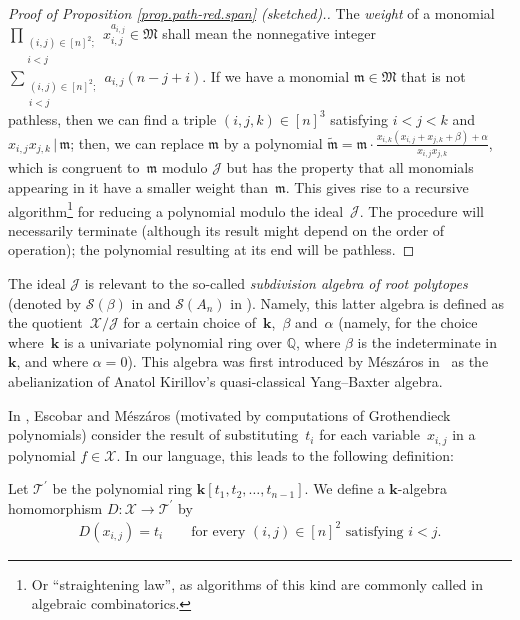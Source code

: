 \documentclass[11pt]{article}
\numberwithin{equation}{section}
\let\sumnonlimits\sum
\let\prodnonlimits\prod
\renewcommand{\sum}{\sumnonlimits\limits}
\renewcommand{\prod}{\prodnonlimits\limits}
\begin{document}
\begin{proof}[Proof of Proposition \ref{prop.path-red.span} (sketched).]The \textit{weight} of a monomial $\prod_{\substack{(i,j) \in[n] ^{2};\\i<j}}x_{i,j}^{a_{i,j}}\in\mathfrak{M}$ shall mean the nonnegative integer $\sum_{\substack{(i,j) \in[n] ^{2};\\i<j}}a_{i,j}(n-j+i) $. If we have a monomial $\mathfrak{m}\in\mathfrak{M}$ that is not pathless, then we can find a triple $ (i,j,k) \in[n] ^{3}$ satisfying $i<j<k$ and $x_{i,j}x_{j,k}\,|\,\mathfrak{m}$; then, we can replace $\mathfrak{m}$ by a polynomial $\widetilde{\mathfrak{m}}=\mathfrak{m}\cdot\frac{x_{i,k}(x_{i,j}+x_{j,k}+\beta) +\alpha}{x_{i,j}x_{j,k}}$, which is congruent to~$\mathfrak{m}$ modulo $\mathcal{J}$ but has the property that all monomials appearing in it have a smaller weight than~$\mathfrak{m}$. This gives rise to a recursive algorithm\footnote{Or ``straightening law'', as algorithms of this kind are commonly called in algebraic combinatorics.} for reducing a polynomial modulo the ideal~$\mathcal{J}$. The procedure will necessarily terminate (although its result might depend on the order of operation); the polynomial resulting at its end will be pathless.
\end{proof}

The ideal $\mathcal{J}$ is relevant to the so-called \textit{subdivision algebra of root polytopes} (denoted by $\mathcal{S}(\beta) $ in \cite[Section~5]{EscMes15} and $\mathcal{S}(A_{n}) $ in \cite[Section~1]{Meszar09}). Namely, this latter algebra is defined as the quotient~$\mathcal{X}/\mathcal{J}$ for a certain choice of~$\mathbf{k}$,~$\beta$ and~$\alpha$ (namely, for the choice where~$\mathbf{k}$ is a univariate polynomial ring over $\mathbb{Q}$, where $\beta$ is the indeterminate in~$\mathbf{k}$, and where $\alpha=0$). This algebra was first introduced by M\'{e}sz\'{a}ros in~\cite{Meszar09} as the abelianization of Anatol Kirillov's quasi-classical
Yang--Baxter algebra.

In \cite[Section~5 and Appendix~A]{EscMes15}, Escobar and M\'{e}sz\'{a}ros (motivated by computations of Grothendieck polynomials) consider the result of substituting~$t_{i}$ for each variable~$x_{i,j}$ in a polynomial $f\in\mathcal{X}$. In our language, this leads to the following definition:

\begin{Definition}Let $\mathcal{T}^{\prime}$ be the polynomial ring $\mathbf{k} [ t_{1},t_{2},\ldots,t_{n-1}] $. We define a $\mathbf{k}$-algebra homomorphism $D\colon \mathcal{X}\rightarrow\mathcal{T}^{\prime}$ by
\begin{gather*}
D ( x_{i,j} ) =t_{i}\qquad \text{for every } (i,j) \in[n] ^{2}\text{ satisfying }i<j.
\end{gather*}
\end{Definition}
\end{document}
